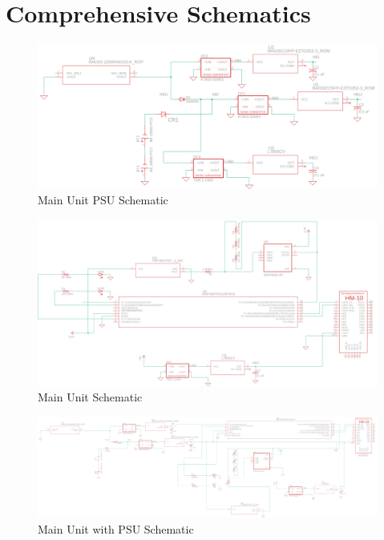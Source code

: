 \documentclass[12pt]{article}
\begin{document}
\appendix
\section{Comprehensive Schematics}
\begin{landscape}
  \begin{center}
  \begin{figure}[H]
    \includegraphics[width=1.6\textwidth, left]{../Modular Design/Main-Unit-PSU/Figures/main-unit-psu.png}
    \caption{Main Unit PSU Schematic}
    \label{fig:main-psu-schematic}
  \end{figure}
  \end{center}


  \begin{center}
  \begin{figure}[H]
    \includegraphics[width=1.6\textwidth, left]{../Appendix/Figures/Main-Unit.png}
    \caption{Main Unit Schematic}
    \label{fig:main-schematic}
  \end{figure}
  \end{center}



  \begin{center}
  \begin{figure}[H]
    \includegraphics[width=\pdfpagewidth,height=0.65\textheight]{../Modular Design/Main-Unit/Figures/main-unit-and-psu.png}
    \caption{Main Unit with PSU Schematic}
    \label{fig:main-with-psu-schematic}
  \end{figure}
  \end{center}


\end{landscape}
\end{document}
